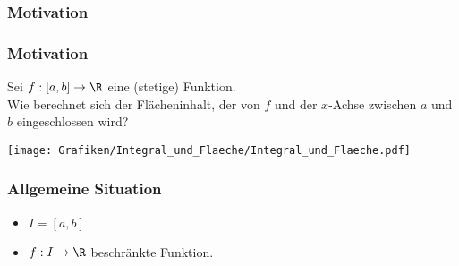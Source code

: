 \subsubsection{Motivation}
%
\begin{frame}\frametitle{Motivation}

	Sei $f: [a,b] \to \R$ eine (stetige) Funktion.\\[1mm]

	Wie berechnet sich der Flächeninhalt, der von $f$ und der $x$-Achse 
	zwischen $a$ und $b$ eingeschlossen wird?
	
	\begin{center}
		\texttt{[image: Grafiken/Integral\_und\_Flaeche/Integral\_und\_Flaeche.pdf]}
	\end{center}

\end{frame}
%
%
\begin{frame}\frametitle{Allgemeine Situation}
\begin{itemize}
\item $I=[a,b]$\\[5mm]
\item $f:I\to \R$ beschränkte Funktion.
\end{itemize}
\end{frame}
%
